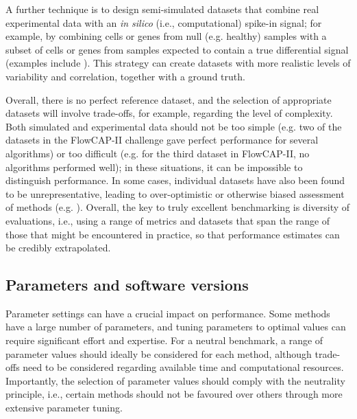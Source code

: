 A further technique is to design semi-simulated datasets that combine real experimental data with an \textit{in silico} (i.e., computational) spike-in signal; for example, by combining cells or genes from null (e.g. healthy) samples with a subset of cells or genes from samples expected to contain a true differential signal (examples include \cite{weber_diffcytdifferentialdiscovery_2019,arvaniti_sensitivedetectionrare_2017,rigaill_syntheticdatasets_2018}). This strategy can create datasets with more realistic levels of variability and correlation, together with a ground truth.

Overall, there is no perfect reference dataset, and the selection of appropriate datasets will involve trade-offs, for example, regarding the level of complexity. Both simulated and experimental data should not be too simple (e.g. two of the datasets in the FlowCAP-II challenge \cite{aghaeepour_criticalassessmentautomated_2013} gave perfect performance for several algorithms) or too difficult (e.g. for the third dataset in FlowCAP-II, no algorithms performed well); in these situations, it can be impossible to distinguish performance. In some cases, individual datasets have also been found to be unrepresentative, leading to over-optimistic or otherwise biased assessment of methods (e.g. \cite{lowes_bralibasedentatale_2017}). Overall, the key to truly excellent benchmarking is diversity of evaluations, i.e., using a range of metrics and datasets that span the range of those that might be encountered in practice, so that performance estimates can be credibly extrapolated.

\subsection{Parameters and software versions}

Parameter settings can have a crucial impact on performance. Some methods have a large number of parameters, and tuning parameters to optimal values can require significant effort and expertise. For a neutral benchmark, a range of parameter values should ideally be considered for each method, although trade-offs need to be considered regarding available time and computational resources. Importantly, the selection of parameter values should comply with the neutrality principle, i.e., certain methods should not be favoured over others through more extensive parameter tuning.

